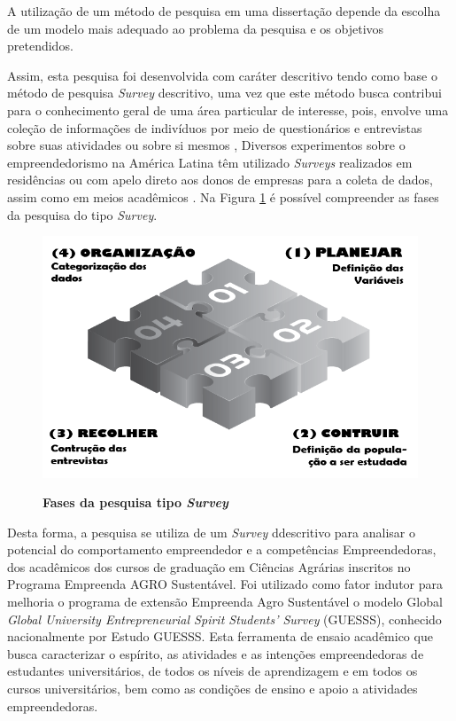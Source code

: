 A utilização de um método de pesquisa em uma dissertação depende da escolha de um modelo mais adequado ao problema da pesquisa e os objetivos pretendidos.

Assim, esta pesquisa foi desenvolvida com caráter descritivo tendo como base o método de pesquisa \textit{Survey} descritivo, uma vez que este método busca contribui para o conhecimento geral de uma área particular de interesse, pois, envolve uma coleção de informações de indivíduos por meio de questionários e entrevistas sobre suas atividades ou sobre si mesmos \cite{forza_survey_2002}, Diversos experimentos sobre o empreendedorismo na América Latina têm utilizado  \textit{Surveys} realizados em residências ou com apelo direto aos donos de empresas para a coleta de dados, assim como em meios acadêmicos \cite{lima_ser_2015}. Na Figura \ref{figura_8} é possível compreender as fases da pesquisa do tipo \textit{Survey}.

\begin{figure}[H]
\centering
\caption{\textbf{Fases da pesquisa tipo \textit{Survey}}}
\includegraphics[scale=0.5]{Imagens/survey.png}
\label{figura_8}
\end{figure}

Desta forma, a pesquisa se utiliza de um \textit{Survey} ddescritivo para analisar o potencial do comportamento empreendedor e a competências Empreendedoras, dos acadêmicos dos cursos de graduação em Ciências Agrárias inscritos no Programa Empreenda AGRO Sustentável. Foi utilizado como fator indutor para melhoria o programa de extensão Empreenda Agro Sustentável o modelo Global \textit{Global University Entrepreneurial Spirit Students’ Survey} (GUESSS), conhecido nacionalmente por Estudo GUESSS. Esta ferramenta de ensaio acadêmico que busca caracterizar o espírito, as atividades e as intenções empreendedoras de estudantes universitários, de todos os níveis de aprendizagem e em todos os cursos universitários, bem como as condições de ensino e apoio a atividades empreendedoras. 

